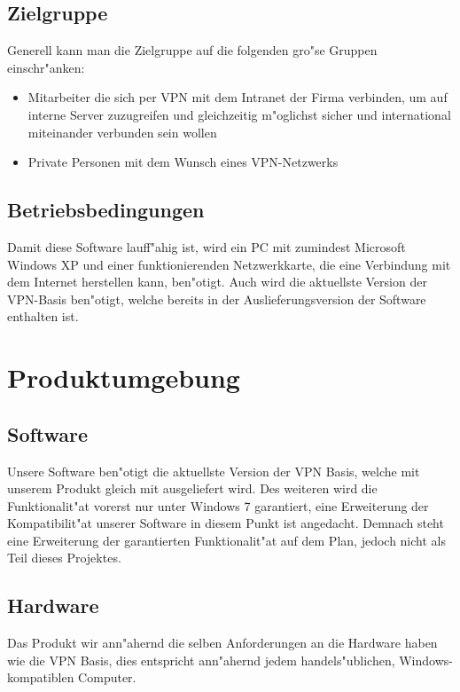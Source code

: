 \documentclass[a4paper,12pt]{scrreprt}
\begin{document}
	\section{Zielgruppe}
	
	Generell kann man die Zielgruppe auf die folgenden gro"se Gruppen einschr"anken:
	\begin{itemize}
	\item Mitarbeiter die sich per VPN mit dem Intranet der Firma verbinden, um auf interne Server zuzugreifen und gleichzeitig m"oglichst sicher und international miteinander verbunden sein wollen
	\item Private Personen mit dem Wunsch eines VPN-Netzwerks
	\end{itemize}
		
	\section{Betriebsbedingungen}
	Damit diese Software lauff"ahig ist, wird ein PC mit zumindest Microsoft Windows XP und einer funktionierenden Netzwerkkarte, die eine Verbindung mit dem Internet herstellen kann, ben"otigt. Auch wird die aktuellste Version der VPN-Basis ben"otigt, welche bereits in der Auslieferungsversion der Software enthalten ist.
		
\chapter{Produktumgebung}
	
	\section{Software}
		
		Unsere Software ben"otigt die aktuellste Version der VPN Basis, welche mit unserem Produkt gleich mit ausgeliefert wird. Des weiteren wird die Funktionalit"at vorerst nur unter Windows 7 garantiert, eine Erweiterung der Kompatibilit"at unserer Software in diesem Punkt ist angedacht. Demnach steht eine Erweiterung der garantierten Funktionalit"at auf dem Plan, jedoch nicht als Teil dieses Projektes.
		
	\section{Hardware}
		
		Das Produkt wir ann"ahernd die selben Anforderungen an die Hardware haben wie die VPN Basis, dies entspricht ann"ahernd jedem handels"ublichen, Windows-kompatiblen Computer.	
		
\end{document}
